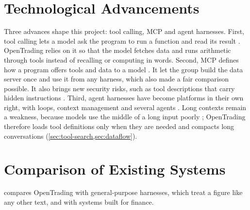 \section{Technological Advancements}\label{sec:advances}
Three advances shape this project: tool calling, MCP and agent harnesses.
First, tool calling lets a model ask the program to run a function and read its result \parencite{qin2024tool}.
OpenTrading relies on it so that the model fetches data and runs arithmetic through tools instead of recalling or computing in words.
Second, MCP defines how a program offers tools and data to a model \parencite{modelcontextprotocol2025specification}.
It let the group build the data server once and use it from any harness, which also made a fair comparison possible.
It also brings new security risks, such as tool descriptions that carry hidden instructions \parencite{hou2026model}.
Third, agent harnesses have become platforms in their own right, with loops, context management and several agents \parencite{wang2025openhands}.
Long contexts remain a weakness, because models use the middle of a long input poorly \parencite{liu2024lost}; OpenTrading therefore loads tool definitions only when they are needed and compacts long conversations (\cref{sec:tool-search,sec:dataflow}).

\section{Comparison of Existing Systems}\label{sec:comparison}
 compares OpenTrading with general-purpose harnesses, which treat a figure like any other text, and with systems built for finance.


